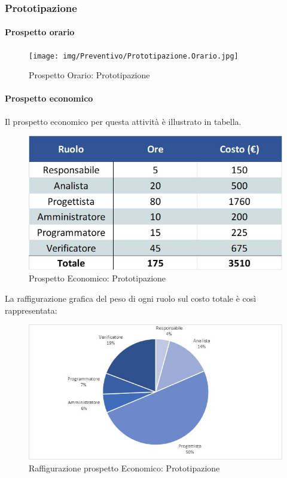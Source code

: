 \subsubsection{Prototipazione}
\paragraph{Prospetto orario}
\begin{figure}[h!]
	\centerline{\texttt{[image: img/Preventivo/Prototipazione.Orario.jpg]}}
	\caption{Prospetto Orario: Prototipazione}
\end{figure}
\paragraph{Prospetto economico}
Il prospetto economico per questa attività è illustrato in tabella. 
\begin{figure}[h!]
	\centerline{\includegraphics[scale=0.4]{img/Preventivo/Prototipazione.Economico.jpg}}
	\caption{Prospetto Economico: Prototipazione}
\end{figure}
La raffigurazione grafica del peso di ogni ruolo sul costo totale è così rappresentata: 
\begin{figure}[h!]
	\centerline{\includegraphics[scale=0.4]{img/Preventivo/Torte/Prototipazione.jpg}}
	\caption{Raffigurazione prospetto Economico: Prototipazione}
\end{figure}

